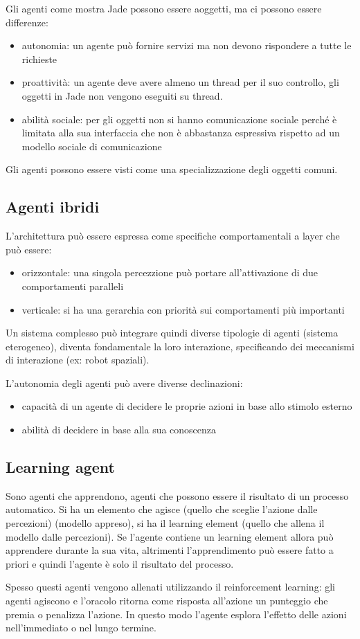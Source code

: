 Gli agenti come mostra Jade possono essere aoggetti, ma ci possono essere differenze:
\begin{itemize}
    \item autonomia: un agente può fornire servizi ma non devono rispondere a tutte 
    le richieste
    \item proattività: un agente deve avere almeno un thread per il suo controllo,
    gli oggetti in Jade non vengono eseguiti su thread.
    \item abilità sociale: per gli oggetti non si hanno comunicazione sociale perché
    è limitata alla sua interfaccia che non è abbastanza espressiva rispetto ad un
    modello sociale di comunicazione
\end{itemize}

Gli agenti possono essere visti come una specializzazione degli oggetti comuni.

\subsection{Agenti ibridi}
L'architettura può essere espressa come specifiche comportamentali
a layer che può essere:
\begin{itemize}
    \item orizzontale: una singola percezzione può portare all'attivazione di due 
    comportamenti paralleli
    \item verticale: si ha una gerarchia con priorità sui comportamenti più importanti
\end{itemize}

Un sistema complesso può integrare quindi diverse tipologie di agenti (sistema eterogeneo), diventa fondamentale
la loro interazione, specificando dei meccanismi di interazione (ex: robot spaziali).

L'autonomia degli agenti può avere diverse declinazioni:
\begin{itemize}
    \item capacità di un agente di decidere le proprie azioni in base allo stimolo
    esterno
    \item abilità di decidere in base alla sua conoscenza
\end{itemize}

\subsection{Learning agent}
Sono agenti che apprendono, agenti che possono essere il risultato di un processo 
automatico. 
Si ha un elemento che agisce (quello che sceglie l'azione dalle percezioni) (modello appreso),
si ha il learning element (quello che allena il modello dalle percezioni). 
Se l'agente contiene un learning element allora può apprendere durante la sua vita,
altrimenti l'apprendimento può essere fatto a priori e quindi l'agente è solo il 
risultato del processo.

Spesso questi agenti vengono allenati utilizzando il reinforcement learning:
gli agenti agiscono e l'oracolo ritorna come risposta all'azione un punteggio che 
premia o penalizza l'azione. In questo modo l'agente esplora l'effetto delle azioni 
nell'immediato o nel lungo termine.